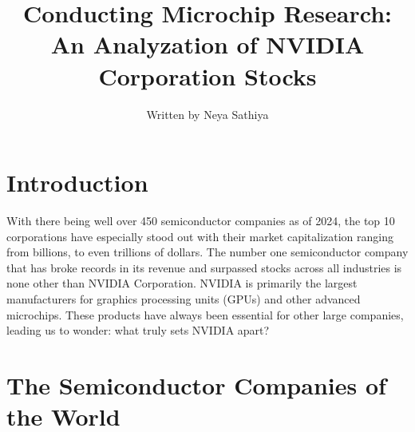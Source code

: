 \documentclass[article, 9pt]{extarticle}
\begin{document}
\title{Conducting Microchip Research: An Analyzation of NVIDIA Corporation Stocks}

\author[1, 2]{Written by Neya Sathiya}


\setcounter{Maxaffil}{0}
\renewcommand\Affilfont{\itshape\small}

\date{}  
\maketitle

\section{Introduction}

With there being well over 450 semiconductor companies as of 2024, the top 10 corporations have especially stood out with their market capitalization ranging from billions, to even trillions of dollars. The number one semiconductor company that has broke records in its revenue and surpassed stocks across all industries is none other than NVIDIA Corporation. NVIDIA is primarily the largest manufacturers for graphics processing units (GPUs) and other advanced microchips. These products have always been
essential for other large companies, leading us to wonder: what truly sets NVIDIA apart?

\section{The Semiconductor Companies of the World}
\end{document}
